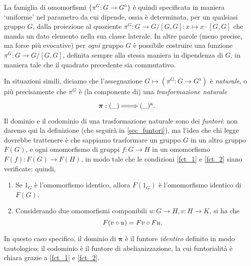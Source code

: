 La famiglia di omomorfismi \(\{\pi^G : G\to G^\text{a}\}\) è quindi specificata in maniera `uniforme' nel parametro da cui dipende, ossia è determinata, per un qualsiasi gruppo \(G\), dalla proiezione al quoziente \(\pi^G : G\to G/[G,G] : x\mapsto x\cdot[G,G]\) che manda un dato elemento nella sua classe laterale. In altre parole (meno precise, ma forse più evocative) per \emph{ogni} gruppo \(G\) è possibile costruire una funzione \(\pi^G : G\to G/[G,G]\), definita sempre alla stessa maniera in dipendenza di \(G\), in maniera tale che il quadrato precedente sia commutativo.

In situazioni simili, diciamo che l'assegnazione \(G\mapsto (\pi^G : G\to G^\text{a})\) è \emph{naturale}, o più precisamente che \(\pi^G\) è (la componente di) una \emph{trasformazione naturale}
\[\xymatrix{\boldsymbol\pi  : (\_) \ar@{=>}[r] & (\_)^\text{a}.}\]
Il dominio e il codominio di una trasformazione naturale sono dei \emph{funtori}: non daremo qui la definizione (che seguirà in \ref{sec_funtori}), ma l'idea che chi legge dovrebbe trattenere è che sappiamo trasformare un gruppo \(G\) in un altro gruppo \(F(G)\), e ogni omomorfismo di gruppi \(f : G\to H\) in un omomorfismo \(F(f) : F(G)\to F(H)\), in modo tale che le condizioni \ref{fct_1} e \ref{fct_2} siano verificate: quindi,
\begin{enumerate}
	\item Se \(1_G\) è l'omomorfismo identico, allora \(F(1_G)\) è l'omomorfismo identico di \(F(G)\).
	\item Considerando due omomorfismi componibili \(u : G\to H, v : H\to K\), si ha che
	      \[F(v\circ u) = Fv \circ Fu.\]
\end{enumerate}
In questo caso specifico, il dominio di \(\boldsymbol\pi\) è il funtore \emph{identico} definito in modo tautologico; il codominio è il funtore di abelianizzazione, la cui funtorialità è chiara grazie a \ref{fct_1} e \ref{fct_2}.

